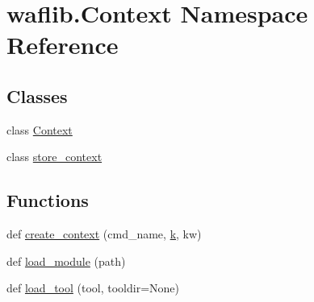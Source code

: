 \hypertarget{namespacewaflib_1_1_context}{}\section{waflib.\+Context Namespace Reference}
\label{namespacewaflib_1_1_context}
\subsection*{Classes}
\begin{DoxyCompactItemize}
\item 
class \hyperlink{classwaflib_1_1_context_1_1_context}{Context}
\item 
class \hyperlink{classwaflib_1_1_context_1_1store__context}{store\+\_\+context}
\end{DoxyCompactItemize}
\subsection*{Functions}
\begin{DoxyCompactItemize}
\item 
def \hyperlink{namespacewaflib_1_1_context_a224d64e5e44f9aae4903dc52235d6470}{create\+\_\+context} (cmd\+\_\+name, \hyperlink{rfft2d_test_m_l_8m_adc468c70fb574ebd07287b38d0d0676d}{k}, kw)
\item 
def \hyperlink{namespacewaflib_1_1_context_ae0923656ff2aebede696050061d6d48d}{load\+\_\+module} (path)
\item 
def \hyperlink{namespacewaflib_1_1_context_a2f9fe1693a40a8fa972154b9eeec3424}{load\+\_\+tool} (tool, tooldir=None)
\end{DoxyCompactItemize}
